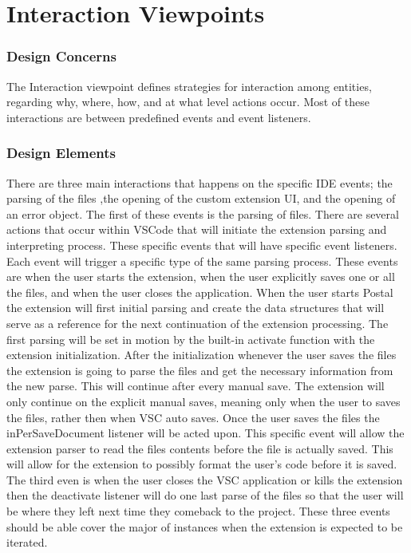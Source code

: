 \documentclass[letterpaper,10pt,titlepage,draftclsnofoot,onecolumn,onesided] {IEEEtran}
\begin{document}
\section{Interaction Viewpoints}

\subsubsection{Design Concerns}
The Interaction viewpoint defines strategies for interaction among entities, regarding why, where, how, and
at what level actions occur. Most of these interactions are between predefined events and event listeners.

\subsubsection{Design Elements}	
	There are three main interactions that happens on the specific IDE events; the parsing of the files ,the opening of the custom extension UI, and the opening of an error object.
	The first of these events is the parsing of files. 
	There are several actions that occur within VSCode that will initiate the extension parsing and interpreting process.
	These specific events that will have specific event listeners. 
	Each event will trigger a specific type of the same parsing process.
	These events are when the user starts the extension, when the user explicitly saves one or all the files, and when the user closes the application.
	When the user starts Postal the extension will first initial parsing and create the data structures that will serve as a reference for the next continuation of the extension processing.
	The first parsing will be set in motion by the built-in activate function with the extension initialization. 
	After the initialization whenever the user saves the files the extension is going to parse the files and get the necessary information from the new parse. 
	This will continue after every manual save.
	The extension will only continue on the explicit manual saves, meaning only when the user to saves the files, rather then when VSC auto saves. 
	Once the user saves the files the inPerSaveDocument listener will be acted upon.\cite{VSCodeDocumentation}
	This specific event will allow the extension parser to read the files contents before the file is actually saved.
	This will allow for the extension to possibly format the user's code before it is saved.
	The third even is when the user closes the VSC application or kills the extension then the deactivate listener will do one last parse of the files so that the user will be where they left next time they 	comeback to the project.
	These three events should be able cover the major of instances when the extension is expected to be iterated.
	
\end{document}
